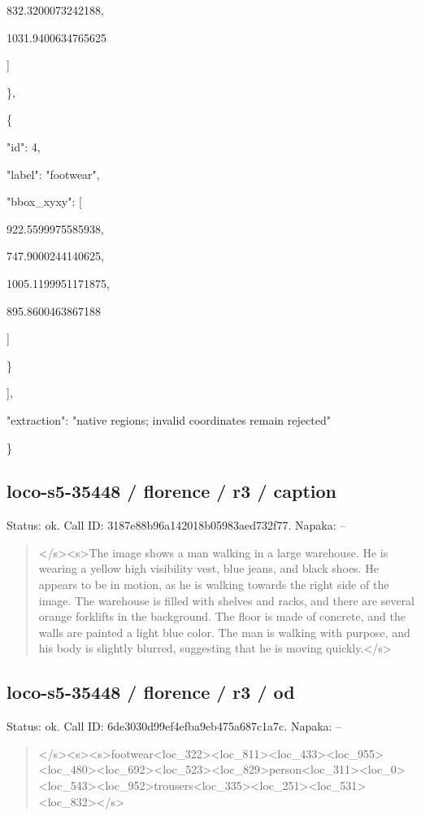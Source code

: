 \documentclass[10pt,a4paper]{article}
\begin{document}
        832.3200073242188,\allowbreak{}\par
        1031.9400634765625\par
      ]\par
    \},\allowbreak{}\par
    \{\par
      "id":\allowbreak{} 4,\allowbreak{}\par
      "label":\allowbreak{} "footwear",\allowbreak{}\par
      "bbox\_xyxy":\allowbreak{} [\par
        922.5599975585938,\allowbreak{}\par
        747.9000244140625,\allowbreak{}\par
        1005.1199951171875,\allowbreak{}\par
        895.8600463867188\par
      ]\par
    \}\par
  ],\allowbreak{}\par
  "extraction":\allowbreak{} "native regions; invalid coordinates remain rejected"\par
\}
\subsection*{loco-s5-35448 / florence / r3 / caption}
Status: ok. Call ID: 3187e88b96a142018b05983aed732f77. Napaka: --
\begin{quote}\footnotesize
</s>\allowbreak{}<s>\allowbreak{}The image shows a man walking in a large warehouse. He is wearing a yellow high visibility vest,\allowbreak{} blue jeans,\allowbreak{} and black shoes. He appears to be in motion,\allowbreak{} as he is walking towards the right side of the image. The warehouse is filled with shelves and racks,\allowbreak{} and there are several orange forklifts in the background. The floor is made of concrete,\allowbreak{} and the walls are painted a light blue color. The man is walking with purpose,\allowbreak{} and his body is slightly blurred,\allowbreak{} suggesting that he is moving quickly.</s>\allowbreak{}
\end{quote}
\subsection*{loco-s5-35448 / florence / r3 / od}
Status: ok. Call ID: 6de3030d99ef4efba9eb475a687c1a7c. Napaka: --
\begin{quote}\footnotesize
</s>\allowbreak{}<s>\allowbreak{}<s>\allowbreak{}footwear<loc\_322>\allowbreak{}<loc\_\allowbreak{}811>\allowbreak{}<loc\_433>\allowbreak{}<loc\_955>\allowbreak{}<loc\_480>\allowbreak{}<\allowbreak{}loc\_692>\allowbreak{}<loc\_523>\allowbreak{}<loc\_829>\allowbreak{}person\allowbreak{}<loc\_311>\allowbreak{}<loc\_0>\allowbreak{}<loc\_543>\allowbreak{}<loc\_95\allowbreak{}2>\allowbreak{}trousers<loc\_335>\allowbreak{}<loc\_251>\allowbreak{}<loc\allowbreak{}\_531>\allowbreak{}<loc\_832>\allowbreak{}</s>\allowbreak{}
\end{quote}
\end{document}
